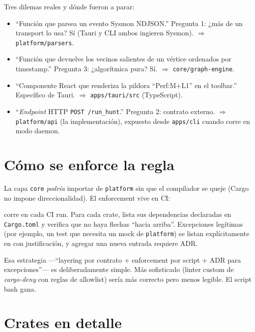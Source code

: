 \begin{ejemplo}
Tres dilemas reales y dónde fueron a parar:
\begin{itemize}
    \item ``Función que parsea un evento Sysmon NDJSON.''
    Pregunta 1: ¿más de un transport lo usa? Sí (Tauri y CLI ambos
    ingieren Sysmon). $\Rightarrow$ \texttt{platform/parsers}.
    \item ``Función que devuelve los vecinos salientes de un vértice
    ordenados por timestamp.'' Pregunta 3: ¿algorítmica pura? Sí.
    $\Rightarrow$ \texttt{core/graph-engine}.
    \item ``Componente React que renderiza la pildora ``Perf:M+L1''
    en el toolbar.'' Específico de Tauri. $\Rightarrow$
    \texttt{apps/tauri/src} (TypeScript).
    \item ``\emph{Endpoint} HTTP \texttt{POST /run\_hunt}.''
    Pregunta 2: contrato externo. $\Rightarrow$
    \texttt{platform/api} (la implementación), expuesto desde
    \texttt{apps/cli} cuando corre en modo daemon.
\end{itemize}
\end{ejemplo}

\section{Cómo se enforce la regla}

La capa \texttt{core} \emph{podría} importar de \texttt{platform} sin
que el compilador se queje (Cargo no impone direccionalidad). El
enforcement vive en CI:

\begin{enelcodigo}
 corre en cada CI run. Para cada
crate, lista sus dependencias declaradas en \texttt{Cargo.toml} y
verifica que no haya flechas ``hacia arriba''. Excepciones legítimas
(por ejemplo, un test que necesita un mock de \texttt{platform}) se
listan explícitamente en 
con justificación, y agregar una nueva entrada requiere ADR.
\end{enelcodigo}

Esa estrategia ---``layering por contrato + enforcement por
script + ADR para excepciones''--- es deliberadamente simple. Más
sofisticado (linter custom de \emph{cargo-deny} con reglas de
allowlist) sería más correcto pero menos legible. El script bash
gana.

\section{Crates en detalle}

